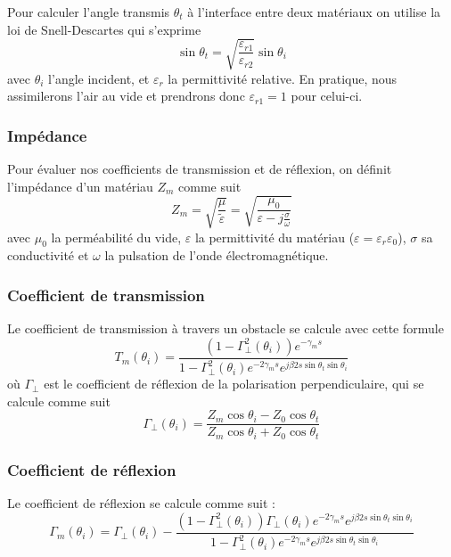 Pour calculer l'angle transmis $\theta_t$ {\`a} l'interface entre deux
mat{\'e}riaux on utilise la loi de Snell-Descartes qui s'exprime
\[ \sin \theta_t = \sqrt{\frac{\varepsilon_{r 1}}{\varepsilon_{r 2}}} \sin \theta_i
\]
avec $\theta_i$ l'angle incident, et $\varepsilon_r$ la permittivit{\'e}
relative. En pratique, nous assimilerons l'air au vide et prendrons donc
$\varepsilon_{r1} = 1$ pour celui-ci.

\subsubsection*{Imp{\'e}dance}

Pour {\'e}valuer nos coefficients de transmission et de r{\'e}flexion, on
d{\'e}finit l'imp{\'e}dance d'un mat{\'e}riau $Z_m$ comme suit
\[ Z_m = \sqrt{\frac{\mu}{\tilde{\varepsilon}}} = \sqrt{\frac{\mu_0}{\varepsilon - j
   \frac{\sigma}{\omega}}} \]
avec $\mu_0$ la perm{\'e}abilit{\'e} du vide, $\varepsilon$ la permittivit{\'e}
du mat{\'e}riau ($\varepsilon=\varepsilon_r\varepsilon_0$), $\sigma$ sa conductivit{\'e} et $\omega$ la pulsation de
l'onde {\'e}lectromagn{\'e}tique.

\subsubsection*{Coefficient de transmission}

Le coefficient de transmission {\`a} travers un obstacle se calcule avec cette
formule
\[ T_m (\theta_i) = \frac{(1 - \Gamma_{\perp}^2 (\theta_i)) e^{- \gamma_m
   s}}{1 - \Gamma_{\perp}^2 (\theta_i) e^{- 2 \gamma_m s} e^{j \beta 2 s \sin
   \theta_t \sin \theta_i}} \]
o{\`u} $\Gamma_{\perp}$ est le coefficient de r{\'e}flexion de la polarisation
perpendiculaire, qui se calcule comme suit
\[ \Gamma_{\perp} (\theta_i) = \frac{Z_m \cos \theta_i - Z_0 \cos
   \theta_t}{Z_m \cos \theta_i + Z_0 \cos \theta_t} \]

\subsubsection*{Coefficient de r{\'e}flexion}

Le coefficient de r{\'e}flexion se calcule comme suit :
\[ \Gamma_m (\theta_i) = \Gamma_{\perp} (\theta_i) - \frac{(1 -
   \Gamma_{\perp}^2 (\theta_i)) \Gamma_{\perp} (\theta_i) e^{- 2 \gamma_m s}
   e^{j \beta 2 s \sin \theta_t \sin \theta_i}}{1 - \Gamma_{\perp}^2
   (\theta_i) e^{- 2 \gamma_m s} e^{j \beta 2 s \sin \theta_t \sin \theta_i}}
\]



